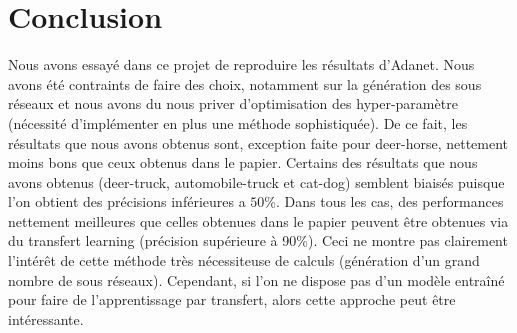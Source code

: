 \documentclass[11 pt]{article}
\begin{document}
\section{Conclusion}
Nous avons essayé dans ce projet de reproduire les résultats d'Adanet. Nous avons été contraints de faire des choix, notamment sur la génération des sous réseaux et nous avons du nous priver d'optimisation des hyper-paramètre (nécessité d'implémenter en plus une méthode sophistiquée). De ce fait, les résultats que nous avons obtenus sont, exception faite pour deer-horse, nettement moins bons que ceux obtenus dans le papier. Certains des résultats que nous avons obtenus (deer-truck, automobile-truck et cat-dog) semblent biais\'es puisque l’on obtient des précisions inférieures a $50\%$.  
Dans tous les cas, des performances nettement meilleures que celles obtenues dans le papier peuvent être obtenues via du transfert learning (précision supérieure à 90\%). Ceci ne montre pas clairement l'intérêt de cette méthode très nécessiteuse de calculs (génération d'un grand nombre de sous réseaux). Cependant, si l'on ne dispose pas d'un modèle entraîné pour faire de l'apprentissage par transfert, alors cette approche peut être intéressante.
\end{document}
